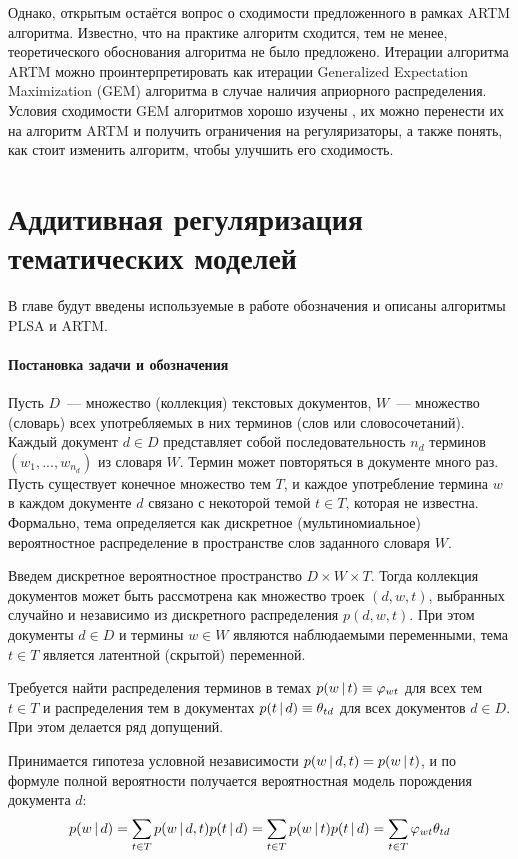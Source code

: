 \documentclass[12pt, twoside]{article}
\begin{document}
Однако, открытым остаётся вопрос о сходимости предложенного в рамках ARTM алгоритма. Известно, что на практике алгоритм сходится, тем не менее, теоретического обоснования алгоритма не было предложено. Итерации алгоритма ARTM можно проинтерпретировать как итерации Generalized Expectation Maximization (GEM) алгоритма \cite{dempster1977maximum} в случае наличия априорного распределения. Условия сходимости GEM алгоритмов хорошо изучены \cite{wu1983convergence}, их можно перенести их на алгоритм ARTM и получить ограничения на регуляризаторы, а также понять, как стоит изменить алгоритм, чтобы улучшить его сходимость.


\section{Аддитивная регуляризация тематических моделей}
В главе будут введены используемые в работе обозначения и описаны алгоритмы PLSA и ARTM.
\paragraph{Постановка задачи и обозначения}
\label{subsec:denotes}
Пусть $D$~--- множество (коллекция) текстовых документов, $W$~--- множество (словарь) всех употребляемых в них терминов (слов или словосочетаний). Каждый документ $d \in D$ представляет собой последовательность $n_d$ терминов $(w_1, . . . , w_{n_d})$ из словаря $W$. Термин может повторяться в документе много раз. Пусть существует конечное множество тем $T$, и каждое употребление термина $w$ в каждом документе $d$ связано с некоторой темой $t \in T$, которая не известна. Формально, тема определяется как дискретное (мультиномиальное) вероятностное распределение в пространстве слов заданного словаря $W$.

Введем дискретное вероятностное пространство $D \times W \times T$. Тогда коллекция документов может быть рассмотрена как множество троек $(d, w, t)$, выбранных случайно и независимо из дискретного распределения $p(d, w, t)$. При этом документы $d \in D$ и термины $w \in W$ являются наблюдаемыми переменными, тема $t \in T$ является латентной (скрытой) переменной.

Требуется найти распределения терминов в темах $p(w \mspace{3mu}{|}\mspace{3mu} t) \equiv \varphi_{wt}$ для всех тем $t \in T$ и распределения тем в документах $p(t \mspace{3mu}{|}\mspace{3mu} d) \equiv \theta_{td}$ для всех документов $d \in D$. При этом делается ряд допущений.

Принимается гипотеза условной независимости $p(w \mspace{3mu}{|}\mspace{3mu} d,t) = p(w \mspace{3mu}{|}\mspace{3mu} t)$, и  по формуле полной вероятности получается вероятностная модель порождения документа $d$:
\[
p(w \mspace{3mu}{|}\mspace{3mu} d) = \sum_{t \in T} p(w \mspace{3mu}{|}\mspace{3mu} d,t)p(t \mspace{3mu}{|}\mspace{3mu} d) = \sum_{t \in T}p(w \mspace{3mu}{|}\mspace{3mu} t)p(t \mspace{3mu}{|}\mspace{3mu} d)=\sum_{t \in T}\varphi_{wt}\theta_{td}
\]
\end{document}
